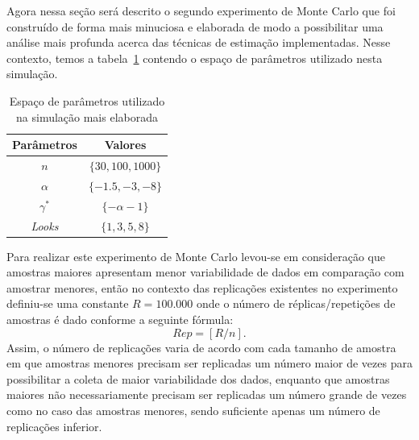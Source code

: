 Agora nessa seção será descrito o segundo experimento de Monte Carlo que foi construído de forma mais minuciosa e elaborada de modo a possibilitar uma análise mais profunda acerca das técnicas de estimação implementadas. 
Nesse contexto, temos a tabela~\ref{tab:tabela_parameters_2} contendo o espaço de parâmetros utilizado nesta simulação.

\begin{table}[H]
\centering
\caption{Espaço de parâmetros utilizado na simulação mais elaborada}
\smallskip
{}
\label{tab:tabela_parameters_2}
\begin{tabular}{c|c}
\toprule 
\multicolumn{1}{c|}{Parâmetros} & \multicolumn{1}{c}{Valores}  \\ 
\midrule
\rowcolor[gray]{.9} 
$n$ & $\{30, 100, 1000\}$ \\ \hline
$\alpha$ & $\{-1.5, -3, -8\}$ \\ \hline
\rowcolor[gray]{.9} $\gamma^*$ & $\{-\alpha - 1\}$ \\ \hline
\textit{Looks} & $\{1, 3, 5, 8\}$ \\ 
\bottomrule
\end{tabular}
\end{table}

Para realizar este experimento de Monte Carlo levou-se em consideração que amostras maiores apresentam menor variabilidade de dados em comparação com amostrar menores, então no contexto das replicações existentes no experimento definiu-se uma constante $R = 100.000$ onde o número de réplicas/repetições de amostras é dado conforme a seguinte fórmula:
\begin{equation}
    Rep = [R/n]. \label{eq:rep}
\end{equation}
Assim, o número de replicações varia de acordo com cada tamanho de amostra em que amostras menores precisam ser replicadas um número maior de vezes para possibilitar a coleta de maior variabilidade dos dados, enquanto que amostras maiores não necessariamente precisam ser replicadas um número grande de vezes como no caso das amostras menores, sendo suficiente apenas um número de replicações inferior. 

